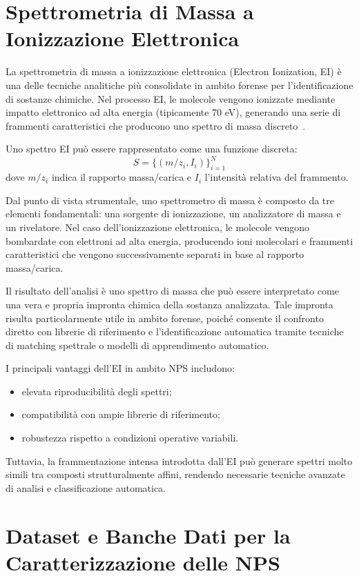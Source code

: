 \section{Spettrometria di Massa a Ionizzazione Elettronica}
\label{sec:ei}

La spettrometria di massa a ionizzazione elettronica (Electron Ionization, EI) è una delle tecniche analitiche più consolidate in ambito forense per l’identificazione di sostanze chimiche.
Nel processo EI, le molecole vengono ionizzate mediante impatto elettronico ad alta energia (tipicamente 70 eV), generando una serie di frammenti caratteristici che producono uno spettro di massa discreto~\cite{gross_mass_spec}.

Uno spettro EI può essere rappresentato come una funzione discreta:
\[
    S = \{(m/z_i, I_i)\}_{i=1}^{N}
\]
dove $m/z_i$ indica il rapporto massa/carica e $I_i$ l’intensità relativa del frammento.

Dal punto di vista strumentale, uno spettrometro di massa è composto da tre elementi fondamentali: una sorgente di ionizzazione, un analizzatore di massa e un rivelatore.
Nel caso dell’ionizzazione elettronica, le molecole vengono bombardate con elettroni ad alta energia, producendo ioni molecolari e frammenti caratteristici che vengono successivamente separati in base al rapporto massa/carica.

Il risultato dell’analisi è uno spettro di massa che può essere interpretato come una vera e propria impronta chimica della sostanza analizzata.
Tale impronta risulta particolarmente utile in ambito forense, poiché consente il confronto diretto con librerie di riferimento e l’identificazione automatica tramite tecniche di matching spettrale o modelli di apprendimento automatico.

I principali vantaggi dell’EI in ambito NPS includono:
\begin{itemize}
    \item elevata riproducibilità degli spettri;
    \item compatibilità con ampie librerie di riferimento;
    \item robustezza rispetto a condizioni operative variabili.
\end{itemize}

Tuttavia, la frammentazione intensa introdotta dall’EI può generare spettri molto simili tra composti strutturalmente affini, rendendo necessarie tecniche avanzate di analisi e classificazione automatica.

\section{Dataset e Banche Dati per la Caratterizzazione delle NPS}
\label{sec:datasets}

